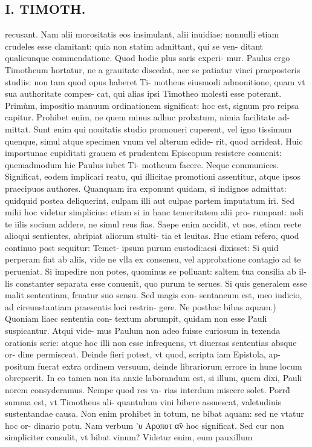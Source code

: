 \documentclass{article}
\begin{document}
\begin{pages}
\section*{I. TIMOTH. }
\marginpar{[ p.70 ]}\pstart recusant. Nam alii morositatis eos insimulant, alii inuidiae: nonnulli etiam crudeles esse clamitant: quia non statim admittant, qui se ven- ditant qualieunque commendatione. Quod hodie plus saris experi- mur. Paulus ergo Timotheum hortatur, ne a grauitate discedat, nec se patiatur vinci praeposteris studiis: non tam quod opus haberet Ti- motheus eiusmodi admonitione, quam vt sua authoritate compes- cat, qui alias ipsi Timotheo molesti esse poterant. Primùm, impositio manuum ordinationem significat: hoc est, signum pro reipsa capitur. Prohibet enim, ne quem minus adhuc probatum, nimia facilitate ad- mittat. Sunt enim qui nouitatis studio promoueri cuperent, vel igno tissimum quenque, simul atque specimen vnum vel alterum edide- rit, quod arrideat. Huic importunae cupiditati grauem et prudentem Episcopum resistere conuenit: quemadmodum hic Paulus iubet Ti- motheum facere.  \pend\pstart Neque communices. Significat, eodem implicari reatu, qui illicitae promotioni assentitur, atque ipsos praecipuos authores. Quanquam ira exponunt quidam, si indignos admittat: quidquid postea deliquerint, culpam illi aut culpae partem imputatum iri. Sed mihi hoc videtur simplicius: etiam si in hanc temeritatem alii pro- rumpant: noli te iilis socium addere, ne simul reus fias. Saepe enim accidit, vt nos, etiam recte alioqui sentientes, abripiat aliorum stulti- tia et leuitas. Huc etiam refero, quod continuo post sequitur: Temet- ipsum purum custodi:acsi dixisset: Si quid perperam fiat ab aliïs, vide ne vlla ex consensu, vel approbatione contagio ad te perueniat. Si impedire non potes, quominus se polluant: saltem tua consilia ab il- lis constanter separata esse conuenit, quo purum te serues. Si quis generalem esse malit sententiam, fruatur suo sensu. Sed magis con- sentaneum est, meo iudicio, ad cireunstantiam praesentis loci restrin- gere.  \pend\pstart Ne posthac bibas aquam.) Quoniam liaec sententia con- textum abrumpit, quidam non esse Pauli suspicantur. Atqui vide- mus Paulum non adeo fuisse curiosum in texenda orationis serie: atque hoc illi non esse infrequens, vt diuersas sententias absque or- dine permisceat. Deinde fieri potest, vt quod, scripta iam Epistola, ap- positum fuerat extra ordinem versuum, deinde librariorum errore in hune locum obrepserit. In eo tamen non ita anxie laborandum est, si illum, quem dixi, Pauli norem consyderamus. Nempe quod res va- rias interdum miscere solet. Porrd̀ summa est, vt Timotheus ali- quantulum vini bibere assuescat, valetudinis sustentandae causa. Non enim prohibet in totum, ne bibat aquam: sed ne vtatur hoc or- dinario potu. Nam verbum 'υ Αροποτ α̃ν hoc significat. Sed cur non simpliciter consulit, vt bibat vinum? Videtur enim, eum pauxillum  \pend

\end{pages}
\end{document}
